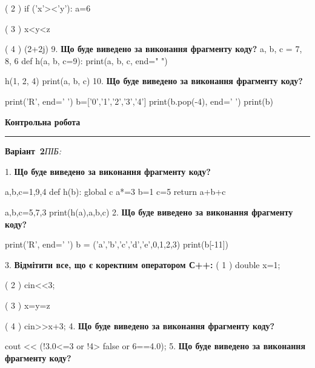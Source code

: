 \documentclass[11pt]{article}
\begin{document}
( 2 ) if ('x'><'y'): a=6

( 3 ) x<y<z

( 4 ) (2+2j)%
\vspace{5mm}
9. \textbf{Що буде виведено за виконання фрагменту коду?}
a, b, c = 7, 8, 6
def h(a, b, c=9):
    print(a, b, c, end=" ")

h(1, 2, 4)
print(a, b, c)
\vspace{5mm}
10. \textbf{Що буде виведено за виконання фрагменту коду?}

print('R', end=' ')
b=['0','1','2','3','4']
print(b.pop(-4), end=' ')
print(b)

\vspace{5mm}










\newpage

\newpage

{\centering\Large\bfseries Контрольна робота\par}
\medskip
\noindent\rule{\linewidth}{0.5pt}
\smallskip
\noindent\textbf{Варіант \No\,2}\hfill \textit{ПІБ:}\,\underline{\hspace{60mm}}
\vspace{4mm}

1. \textbf{Що буде виведено за виконання фрагменту коду?}

a,b,c=1,9,4
def h(b):
global c    a*=3
    b=1
    c=5
    return a+b+c

a,b,c=5,7,3
print(h(a),a,b,c)
\vspace{5mm}
2. \textbf{Що буде виведено за виконання фрагменту коду?}

print('R', end=' ')
b = ('a','b','c','d','e',0,1,2,3)
print(b[-11])

\vspace{5mm}
3. %
\textbf{Відмітити все, що є коректним оператором С++:}
( 1 ) double x=1;

( 2 ) cin<<3;

( 3 ) x=y=z

( 4 ) cin>>x+3;
\vspace{5mm}
4. \textbf{Що буде виведено за виконання фрагменту коду?}

cout << (!3.0<=3 or !4> false or 6==4.0);
\vspace{5mm}
5. \textbf{Що буде виведено за виконання фрагменту коду?}
\end{document}
